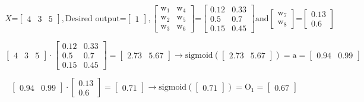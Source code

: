 \begin{enumerate}
$$X \texttt{=}
\left[\begin{smallmatrix}
4 & 3 & 5
\end{smallmatrix}\right]
, 
\text{Desired output}
\texttt{=}
\left[\begin{smallmatrix}
1
\end{smallmatrix}\right]
, 
\left[\begin{smallmatrix}
\text{w}_1 & \text{w}_4\\
\text{w}_2 & \text{w}_5 \\
\text{w}_3 & \text{w}_6
\end{smallmatrix}\right]
\texttt{=}
\left[\begin{smallmatrix}
0.12 & 0.33\\
0.5 & 0.7 \\
0.15 & 0.45
\end{smallmatrix}\right]
\text{and}
\left[\begin{smallmatrix}
\text{w}_7 \\
\text{w}_8
\end{smallmatrix}\right]
\texttt{=}
\left[\begin{smallmatrix}
0.13 \\
0.6
\end{smallmatrix}\right]
$$

$$\left[\begin{smallmatrix}
4 & 3 & 5
\end{smallmatrix}\right]
\cdot 
\left[\begin{smallmatrix}
0.12 & 0.33\\
0.5 & 0.7 \\
0.15 & 0.45
\end{smallmatrix}\right]
=
\left[\begin{smallmatrix}
2.73 & 5.67 
\end{smallmatrix}\right]
\rightarrow
\text{sigmoid}(\left[\begin{smallmatrix}
2.73 & 5.67 
\end{smallmatrix}\right])
=
\text{a}
=
\left[\begin{smallmatrix}
0.94 & 0.99 
\end{smallmatrix}\right]
$$

$$\left[\begin{smallmatrix}
0.94 & 0.99 
\end{smallmatrix}\right]
\cdot 
\left[\begin{smallmatrix}
0.13\\
0.6 
\end{smallmatrix}\right]
=
\left[\begin{smallmatrix}
0.71
\end{smallmatrix}\right]
\rightarrow
\text{sigmoid}(\left[\begin{smallmatrix}
0.71
\end{smallmatrix}\right])
=
\text{O}_1
= 
\left[\begin{smallmatrix}
0.67
\end{smallmatrix}\right]
$$


\end{enumerate}
